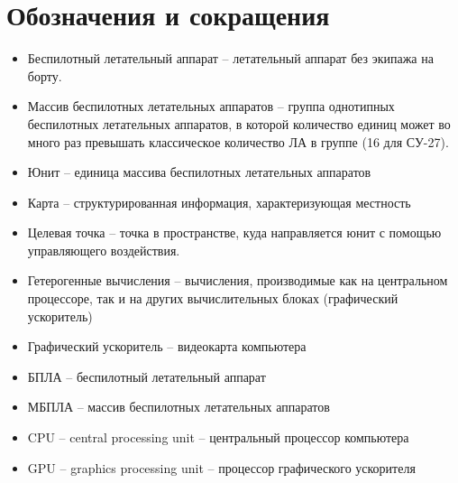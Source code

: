 \section*{Обозначения и сокращения}

\begin{itemize}
\item Беспилотный летательный аппарат -- летательный
      аппарат без экипажа \lb на борту.

\item Массив беспилотных летательных аппаратов -- группа
      однотипных беспилотных летательных аппаратов, в которой
      количество единиц может во много раз превышать
      классическое количество ЛА в группе (16 для СУ-27).

\item Юнит -- единица массива беспилотных летательных аппаратов

\item Карта -- структурированная информация, характеризующая местность

\item Целевая точка -- точка в пространстве, куда направляется юнит с 
    помощью управляющего воздействия.

\item Гетерогенные вычисления -- вычисления, производимые
      как на центральном процессоре, так и на других
      вычислительных блоках (графический ускоритель)

\item Графический ускоритель -- видеокарта компьютера

\item БПЛА -- беспилотный летательный аппарат

\item МБПЛА -- массив беспилотных летательных аппаратов

\item CPU -- central processing unit -- центральный процессор компьютера

\item GPU -- graphics processing unit -- процессор графического ускорителя

\end{itemize}
